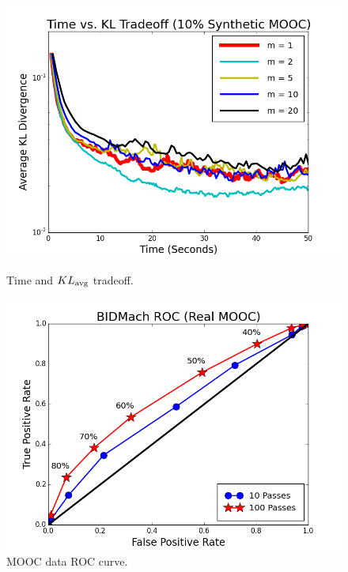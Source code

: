\documentclass{article} %
\begin{document}
\begin{figure}[t]
  \centering
  \begin{minipage}{.5\textwidth}
    \centering
    \includegraphics[width=1\textwidth]{fig_kltime_tradeoff_mooc}
    \caption{Time and $KL_{\rm avg}$ tradeoff.}
    \label{fig:mooc_kl}
  \end{minipage}\hfill
    \begin{minipage}{.5\textwidth}
    \centering
    \includegraphics[width=1\textwidth]{fig_bidmach_real_mooc_roc_curve}
    \caption{MOOC data ROC curve.}
    \label{fig:mooc_accuracy}
  \end{minipage}
\end{figure}
\end{document}
